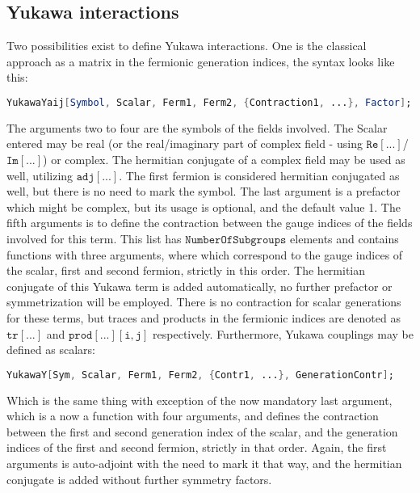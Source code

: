 \documentclass{scrartcl}
\begin{document}
\subsection{Yukawa interactions}
Two possibilities exist to define Yukawa interactions. One is the classical approach as a matrix in the fermionic generation indices, the syntax looks like this:
\begin{lstlisting}[language=mathematica,mathescape,columns=flexible,backgroundcolor=\color{light-gray}]
YukawaYaij[Symbol, Scalar, Ferm1, Ferm2, {Contraction1, ...}, Factor];
\end{lstlisting}
The arguments two to four are the symbols of the fields involved. The Scalar entered may be real (or the real/imaginary part of complex field - using $\mathtt{Re[...]}$/$\mathtt{Im[...]}$) or complex. The hermitian conjugate of a complex field may be used as well, utilizing $\mathtt{adj[...]}$. The first fermion is considered hermitian conjugated as well, but there is no need to mark the symbol. The last argument is a prefactor which might be complex, but its usage is optional, and the default value 1. The fifth arguments is to define the contraction between the gauge indices of the fields involved for this term. This list has $\mathtt{NumberOfSubgroups}$ elements and contains functions with three arguments, where which correspond to the gauge indices of the scalar, first and second fermion, strictly in this order. The hermitian conjugate of this Yukawa term is added automatically, no further prefactor or symmetrization will be employed. There is no contraction for scalar generations for these terms, but traces and products in the fermionic indices are denoted as $\mathtt{tr[...]}$ and $\mathtt{prod[...][i,j]}$ respectively.\newline 
Furthermore, Yukawa couplings may be defined as scalars:
\begin{lstlisting}[language=mathematica,mathescape,columns=flexible,backgroundcolor=\color{light-gray}]
YukawaY[Sym, Scalar, Ferm1, Ferm2, {Contr1, ...}, GenerationContr];
\end{lstlisting}
Which is the same thing with exception of the now mandatory last argument, which is a now a function with four arguments, and defines the contraction between the first and second generation index of the scalar, and the generation indices of the first and second fermion, strictly in that order. Again, the first arguments is auto-adjoint with the need to mark it that way, and the hermitian conjugate is added without further symmetry factors.
\end{document}
